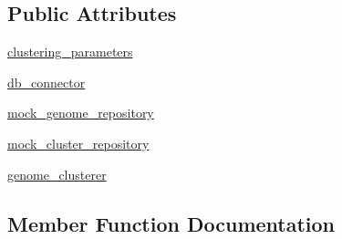 \subsection*{Public Attributes}
\begin{DoxyCompactItemize}
\item 
\hyperlink{classNEAT__PyGenetics_1_1NEAT_1_1Tests_1_1GenomeClustererTests_1_1test__genomeClusterer_1_1TestGenomeClusterer_a9cc349e3e78e1616840e36bcfd3a6834}{clustering\+\_\+parameters}
\item 
\hyperlink{classNEAT__PyGenetics_1_1NEAT_1_1Tests_1_1GenomeClustererTests_1_1test__genomeClusterer_1_1TestGenomeClusterer_aa5acaa2c17a115c32c5317a067be0016}{db\+\_\+connector}
\item 
\hyperlink{classNEAT__PyGenetics_1_1NEAT_1_1Tests_1_1GenomeClustererTests_1_1test__genomeClusterer_1_1TestGenomeClusterer_a1abfe40b10ff6d4cd6a58f4fca6c76b8}{mock\+\_\+genome\+\_\+repository}
\item 
\hyperlink{classNEAT__PyGenetics_1_1NEAT_1_1Tests_1_1GenomeClustererTests_1_1test__genomeClusterer_1_1TestGenomeClusterer_a78d0e64bf2b3100d5d291f433c7020eb}{mock\+\_\+cluster\+\_\+repository}
\item 
\hyperlink{classNEAT__PyGenetics_1_1NEAT_1_1Tests_1_1GenomeClustererTests_1_1test__genomeClusterer_1_1TestGenomeClusterer_a73efd20ba6c48aeab0c9fe41a444c334}{genome\+\_\+clusterer}
\end{DoxyCompactItemize}


\subsection{Member Function Documentation}
